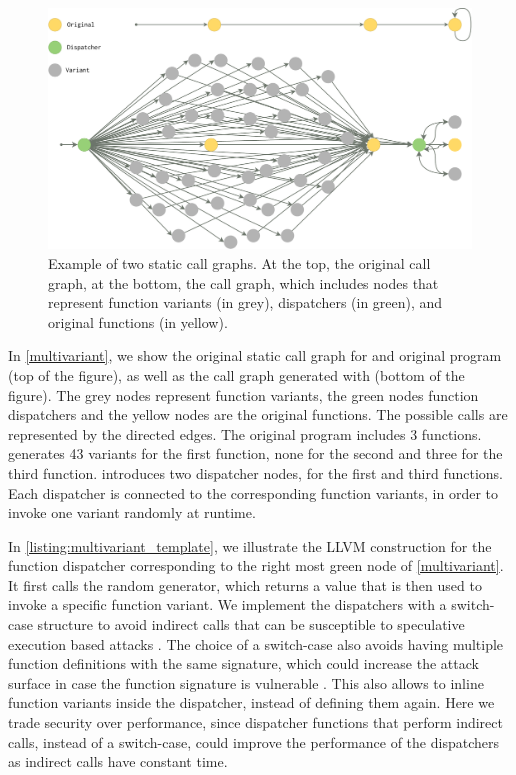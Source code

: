 \begin{figure}
    \centering
  \includegraphics[width=.8\linewidth]{diagrams/CFG.pdf}
  \caption{Example of two static call graphs. At the top, the original call graph, at the bottom, the call graph, which includes nodes that represent function variants (in grey), dispatchers (in green), and original functions  (in yellow).
}
  \label{multivariant}
\end{figure}

In \autoref{multivariant}, we show the original static call graph for and original program (top of the figure), as well as the call graph generated with \tool (bottom of the figure).
The grey nodes represent function variants, the green nodes function dispatchers and the yellow nodes are the original functions.
The possible calls are represented by the directed edges.
The original program includes 3 functions. \tool generates 43 variants for the first function, none for the second and three for the third function. 
\tool introduces two dispatcher nodes, for the first and third functions. Each dispatcher is connected to the corresponding function variants, in order to invoke one variant randomly at runtime.


In  \autoref{listing:multivariant_template}, we illustrate the LLVM construction for the function dispatcher corresponding to the right most green node of \autoref{multivariant}.
It first calls the random generator, which returns a value that is then used to invoke a specific function variant. 
We implement the dispatchers with a switch-case structure to avoid indirect calls that can be susceptible to speculative execution based attacks \cite{Narayan2021Swivel}. 
The choice of a switch-case also avoids having multiple function definitions with the same signature, which could increase the attack surface in case the function signature is vulnerable \cite{johnson2021}.
This also allows \tool to inline function variants inside the dispatcher, instead of defining them again.
Here we trade security over performance, since dispatcher functions  that perform indirect calls, instead of a switch-case,  could improve the performance  of the dispatchers as indirect calls have constant time.


